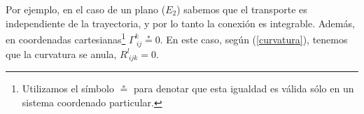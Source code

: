 Por ejemplo, en el caso de un plano ($E_2$) sabemos que el transporte es independiente de la trayectoria, y por lo tanto la conexión es integrable. Además, en coordenadas cartesianas\footnote{Utilizamos el símbolo $\overset{\ast}{=}$ para denotar que esta igualdad es válida sólo en un sistema coordenado particular.} $\Gamma_{\ ij}^k \overset{\ast}{=}0$. En este caso,
según (\ref{curvatura}), tenemos que la curvatura se anula, $R_{\ ijk}^l =0$.

%
%
%
